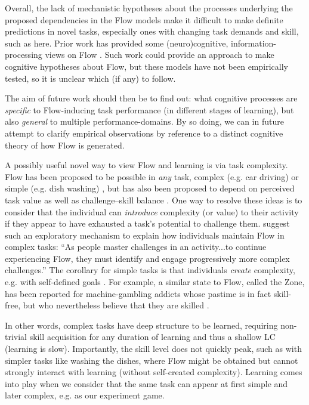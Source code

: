 \documentclass{frontierstyle/frontiersSCNS}
\begin{document}
Overall, the lack of mechanistic hypotheses about the processes underlying the proposed dependencies in the Flow models make it difficult to make definite predictions in novel tasks, especially ones with changing task demands and skill, such as here. Prior work has provided some (neuro)cognitive, information-processing views on Flow \citep{Marr2001,Cowley2008,Simlesa2018}. Such work could provide an approach to make cognitive hypotheses about Flow, but these models have not been empirically tested, so it is unclear which (if any) to follow.

The aim of future work should then be to find out: what cognitive processes are {\it specific} to Flow-inducing task performance (in different stages of learning), but also {\it general} to multiple performance-domains. By so doing, we can in future attempt to clarify empirical observations by reference to a distinct cognitive theory of how Flow is generated.

A possibly useful novel way to view Flow and learning is via task complexity. Flow has been proposed to be possible in {\it any} task, complex (e.g. car driving) or simple (e.g. dish washing) \citep{Csikszentmihalyi1999}, but has also been proposed to depend on perceived task value as well as challenge--skill balance \citep{Keller2012}. One way to resolve these ideas is to consider that the individual can {\it introduce} complexity (or value) to their activity if they appear to have exhausted a task's potential to challenge them. \cite{Nakamura2002} suggest such an exploratory mechanism to explain how individuals maintain Flow in complex tasks: ``As people master challenges in an activity...to continue experiencing Flow, they must identify and engage progressively more complex challenges.'' The corollary for simple tasks is that individuals {\it create} complexity, e.g. with self-defined goals \citep{Rauterberg1995}. For example, a similar state to Flow, called the Zone, has been reported for machine-gambling addicts whose pastime is in fact skill-free, but who nevertheless believe that they are skilled \citep{Schull2014}.

In other words, complex tasks have deep structure to be learned, requiring non-trivial skill acquisition for any duration of learning and thus a shallow LC (learning is slow). Importantly, the skill level does not quickly peak, such as with simpler tasks like washing the dishes, where Flow might be obtained but cannot strongly interact with learning (without self-created complexity). Learning comes into play when we consider that the same task can appear at first simple and later complex, e.g. as our experiment game.
\end{document}
